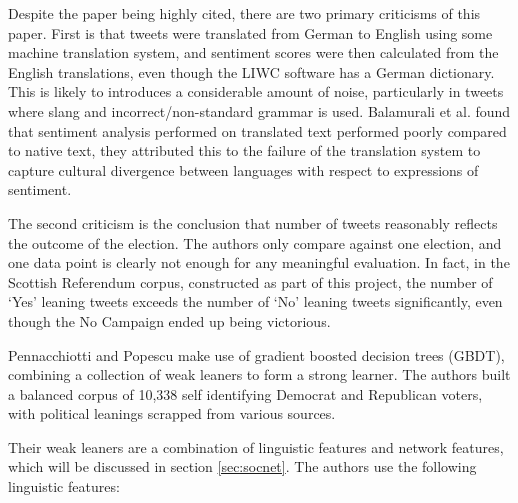 \documentclass[bsc,frontabs,singlespacing,parskip]{infthesis}     %
\begin{document}
Despite the paper being highly cited, there are two primary criticisms of this paper. First is that tweets were translated from German to English using some machine translation system, and sentiment scores were then calculated from the English translations, even though the LIWC software has a German dictionary. This is likely to introduces a considerable amount of noise, particularly in tweets where slang and incorrect/non-standard grammar is used. Balamurali et al. \cite{balamurali2013lost} found that sentiment analysis performed on translated text performed poorly compared to native text, they attributed this to the failure of the translation system to capture cultural divergence between languages with respect to expressions of sentiment.

The second criticism is the conclusion that number of tweets reasonably reflects the outcome of the election. The authors only compare against one election, and one data point is clearly not enough for any meaningful evaluation. In fact, in the Scottish Referendum corpus, constructed as part of this project, the number of `Yes' leaning tweets exceeds the number of `No' leaning tweets significantly, even though the No Campaign ended up being victorious. 

Pennacchiotti and Popescu \cite{yahoopaper} make use of gradient boosted decision trees (GBDT), combining a collection of weak leaners to form a strong learner. The authors built a balanced corpus of 10,338 self identifying Democrat and Republican voters, with political leanings scrapped from various sources. 

Their weak leaners are a combination of linguistic features and network features, which will be discussed in section \ref{sec:socnet}. The authors use the following linguistic features:
\end{document}
